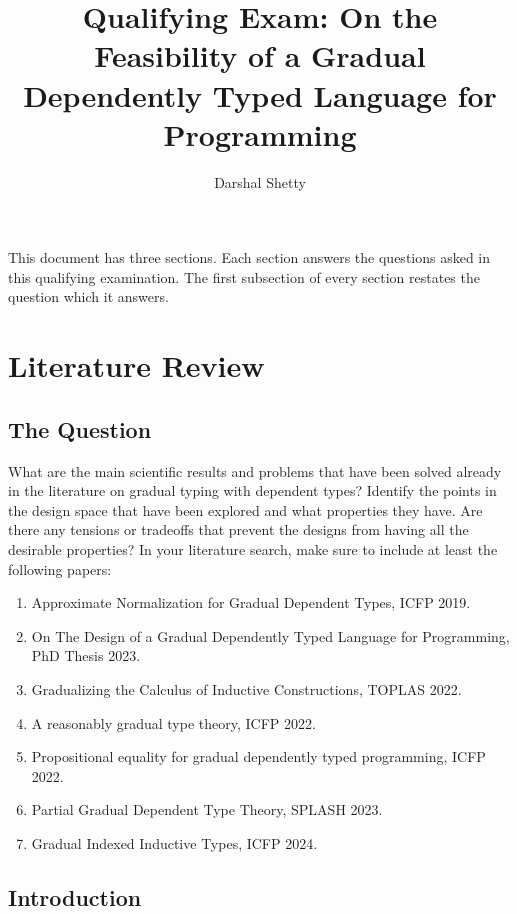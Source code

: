 \documentclass{article}
\title{Qualifying Exam: On the Feasibility of a Gradual Dependently Typed
  Language for Programming}
\author{Darshal Shetty}
\date{}
\begin{document}
\maketitle

This document has three sections. Each section answers the questions asked in
this qualifying examination. The first subsection of every section restates the
question which it answers.

\section{Literature Review}%
\label{sec:question1}

\subsection{The Question}
What are the main scientific results and problems that have been solved already
in the literature on gradual typing with dependent types? Identify the points in
the design space that have been explored and what properties they have. Are
there any tensions or tradeoffs that prevent the designs from having all the
desirable properties? In your literature search, make sure to include at least
the following papers:

\begin{enumerate}
  \item Approximate Normalization for Gradual Dependent Types, ICFP
    2019.\cite{eremondi_approximate_2019}
  \item On The Design of a Gradual Dependently Typed Language for Programming,
    PhD Thesis 2023.\cite{eremondi_design_2023}
  \item Gradualizing the Calculus of Inductive Constructions, TOPLAS
    2022.\cite{lennon-bertrand_gradualizing_2022}
  \item A reasonably gradual type theory, ICFP
    2022.\cite{maillard_reasonably_2022}
  \item Propositional equality for gradual dependently typed programming, ICFP
    2022.\cite{eremondi_propositional_2022}
  \item Partial Gradual Dependent Type Theory, SPLASH
    2023.\cite{shi_partial_2023}
  \item Gradual Indexed Inductive Types, ICFP 2024.\cite{malewski_gradual_2024}
\end{enumerate}

\subsection{Introduction}
\end{document}
